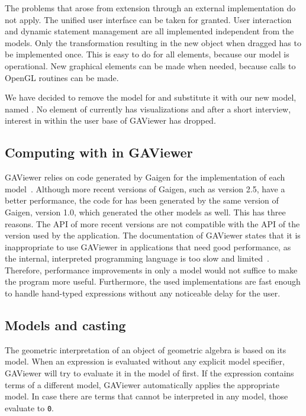 The problems that arose from extension through an external implementation do not apply.  The unified user interface can be taken for granted.  User interaction and dynamic statement management are all implemented independent from the models.  Only the transformation resulting in the new object when dragged has to be implemented once.  This is easy to do for all elements, because our model is operational.  New graphical elements can be made when needed, because calls to OpenGL routines can be made. 

We have decided to remove the model for \iga{} and substitute it with our new model, named \lga{}.  No element of \iga{} currently has visualizations and after a short interview, interest in \iga{} within the user base of GAViewer has dropped.

\subsection{Computing with \lga{} in GAViewer}
GAViewer relies on code generated by Gaigen for the implementation of each model~\cite{Gaigen}.  Although more recent versions of Gaigen, such as version 2.5, have a better performance, the code for \lga{} has been generated by the same version of Gaigen, version 1.0, which generated the other models as well.  This has three reasons.  The API of more recent versions are not compatible with the API of the version used by the application.  The documentation of GAViewer states that it is inappropriate to use GAViewer in applications that need good performance, as the internal, interpreted programming language is too slow and limited~\cite[page 7]{GAViewer}.  Therefore, performance improvements in only a model would not suffice to make the program more useful.  Furthermore, the used implementations are fast enough to handle hand-typed expressions without any noticeable delay for the user.

\subsection{Models and casting}
The geometric interpretation of an object of geometric algebra is based on its model.  When an expression is evaluated without any explicit model specifier, GAViewer will try to evaluate it in the model of \ega{} first.  If the expression contains terms of a different model, GAViewer automatically applies the appropriate model.  In case there are terms that cannot be interpreted in any model, those evaluate to \texttt{0}.

